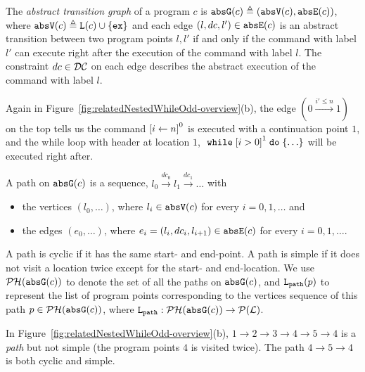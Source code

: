 \begin{defn}
 \label{def:abs_cfg}
 The \emph{abstract transition graph} of a program $c$ is $\mathtt{abs}{\mathtt{G}}(c) \triangleq (\mathtt{abs}{\mathtt{V}}(c), \mathtt{abs}{\mathtt{E}}(c))$, where
 $\mathtt{abs}{\mathtt{V}}(c) \triangleq \mathtt{L}(c)\cup\{\mathtt{ex}\}$
 and 
 each edge $(l, dc, l') \in \mathtt{abs}{\mathtt{E}}(c)$ is an abstract transition
between two program points $l, l'$ if and only if
the command with label $l'$ can execute right after the execution of the command with label $l$.
The constraint $dc \in \mathcal{DC}$ on each edge
describes the abstract execution of the command with label $l$.
\end{defn}
Again in Figure~\ref{fig:relatedNestedWhileOdd-overview}(b),
the edge $(0 \xrightarrow{i' \leq n} 1)$ on the top tells us the command 
$\clabel{\assign{i}{n}}^0$ is executed with a continuation point $1$, and the while loop with header at location $1$, $\ewhile \clabel{i > 0}^1 \edo \{\ldots\}$ will be executed right after.

\begin{defn}[Path]
 \label{def:abs_cfgpath} 
 A path on $\mathtt{abs}{\mathtt{G}}(c)$ is a sequence, $ l_0 \xrightarrow{dc_0} l_1 \xrightarrow{dc_1} \ldots $ with
 \begin{itemize}
 \item the vertices $(l_0, \ldots)$, where $l_i \in \mathtt{abs}{\mathtt{V}}(c)$ for every $i = 0, 1, \ldots$ and
 \item the edges $(e_0, \ldots)$, where $e_i = (l_{i}, dc_i, l_{i + 1}) \in \mathtt{abs}{\mathtt{E}}(c)$ for every $i = 0, 1, \ldots$.
 \end{itemize}
 A path is cyclic if it has the same start- and end-point. A path is simple if it does not visit a location twice except for the start- and end-location. We use $\mathcal{PH}(\mathtt{abs}{\mathtt{G}}(c))$ to denote the set of all the paths on $\mathtt{abs}{\mathtt{G}}(c)$,
 and $\mathtt{L}_{\mathtt{path}}(p)$ to represent the list of program points corresponding to the vertices sequence of this path $p \in \mathcal{PH}(\mathtt{abs}{\mathtt{G}}(c))$,
 where $\mathtt{L}_{\mathtt{path}}: \mathcal{PH}(\mathtt{abs}{\mathtt{G}}(c)) \to \mathcal{P}{(\mathcal{L})}$.
 \end{defn}
 In Figure~\ref{fig:relatedNestedWhileOdd-overview}(b), $1 \to 2 \to 3 \to 4 \to 5 \to 4$ is a \emph{path} but not simple (the program points $4$ is visited twice). The path $4 \to 5 \to 4$ is both cyclic and simple.
